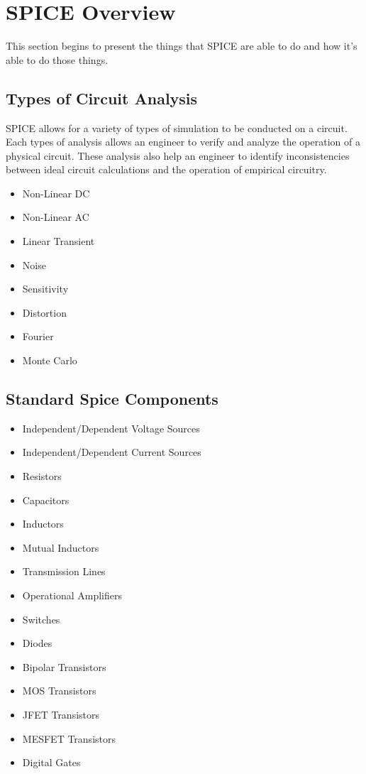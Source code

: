 \documentclass{article}
\begin{document}
\section{SPICE Overview}
This section begins to present the things that SPICE are able to do and how it's able to do those things. 
\subsection{Types of Circuit Analysis}
SPICE allows for a variety of types of simulation to be conducted on a circuit. Each types of analysis allows an engineer to verify and analyze the operation of a physical circuit. These analysis also help an engineer to identify inconsistencies between ideal circuit calculations and the operation of empirical circuitry.
\begin{itemize}
\item Non-Linear DC
\item Non-Linear AC 
\item Linear Transient
\item Noise
\item Sensitivity
\item Distortion
\item Fourier
\item Monte Carlo
\end{itemize}
\cleardoublepage
\subsection{Standard Spice Components}
\begin{itemize}
\item Independent/Dependent Voltage Sources
\item Independent/Dependent Current Sources
\item Resistors
\item Capacitors
\item Inductors
\item Mutual Inductors
\item Transmission Lines
\item Operational Amplifiers
\item Switches
\item Diodes
\item Bipolar Transistors
\item MOS Transistors
\item JFET Transistors
\item MESFET Transistors
\item Digital Gates
\end{itemize}
\cleardoublepage
\setcounter{page}{1}


\end{document}
